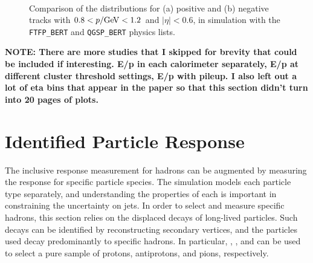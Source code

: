 \begin{figure}[ht]
\centering
{}
~
\caption{ Comparison of the \ep distributions for (a) positive and (b) negative tracks with $0.8< p/\GeV<1.2$ and $|\eta|<0.6$, in simulation with the \texttt{FTFP\_BERT} and \texttt{QGSP\_BERT} physics lists.}
\label{fig:eoverp_charge}
\end{figure}

\textbf{NOTE: There are more studies that I skipped for brevity that could be included if interesting. E/p in each calorimeter separately, E/p at different cluster threshold settings, E/p with pileup. I also left out a lot of eta bins that appear in the paper so that this section didn't turn into 20 pages of plots.}


\section{Identified Particle Response}
\label{sec:identified}

The inclusive response measurement for hadrons can be augmented by measuring the response for specific particle species. 
The simulation models each particle type separately, and understanding the properties of each is important in constraining the uncertainty on jets. 
In order to select and measure specific hadrons, this section relies on the displaced decays of long-lived particles. 
Such decays can be identified by reconstructing secondary vertices, and the particles used decay predominantly to specific hadrons.
In particular, \pL, \pLB, and \pKS can be used to select a pure sample of protons, antiprotons, and pions, respectively. 

